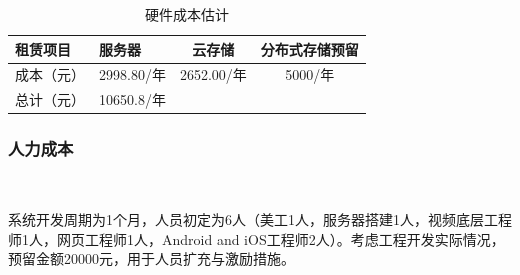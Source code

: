 \begin{table}[H]
  \centering
  \caption{硬件成本估计}
    \begin{tabular}{|p{4.055em}|p{5.555em}cc|}
    \hline
    \textcolor[rgb]{ .298,  .282,  .239}{租赁项目} & \multicolumn{1}{p{5.555em}|}{\textcolor[rgb]{ .298,  .282,  .239}{服务器}} & \multicolumn{1}{p{5.72em}|}{\textcolor[rgb]{ .298,  .282,  .239}{云存储}} & \multicolumn{1}{p{5.835em}|}{\textcolor[rgb]{ .298,  .282,  .239}{分布式存储预留}} \\
    \hline
    \textcolor[rgb]{ .298,  .282,  .239}{成本（元）} & \multicolumn{1}{p{5.555em}|}{\textcolor[rgb]{ .298,  .282,  .239}{2998.80/年}} & \multicolumn{1}{p{5.72em}|}{\textcolor[rgb]{ .298,  .282,  .239}{2652.00/年}} & \multicolumn{1}{p{5.835em}|}{\textcolor[rgb]{ .298,  .282,  .239}{5000/年}} \\
    \hline
    \textcolor[rgb]{ .298,  .282,  .239}{总计（元）} & \multicolumn{3}{p{17.11em}|}{\textcolor[rgb]{ .298,  .282,  .239}{10650.8/年}} \\
    \hline
    \end{tabular}%
  \label{tab:yjcb}%
\end{table}%


\subsubsection{人力成本}\

系统开发周期为1个月，人员初定为6人（美工1人，服务器搭建1人，视频底层工程师1人，网页工程师1人，Android and iOS工程师2人）。考虑工程开发实际情况，预留金额20000元，用于人员扩充与激励措施。

